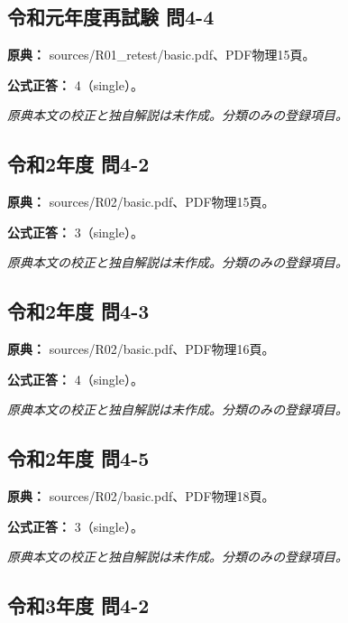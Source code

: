 \subsection{令和元年度再試験 問4-4}
\label{q:r01-ret-basic-4-4}

\noindent\textbf{原典：} sources/R01\_retest/basic.pdf、PDF物理15頁。

\textbf{公式正答：} 4（single）。

\par\textit{原典本文の校正と独自解説は未作成。分類のみの登録項目。}

\subsection{令和2年度 問4-2}
\label{q:r02-reg-basic-4-2}

\noindent\textbf{原典：} sources/R02/basic.pdf、PDF物理15頁。

\textbf{公式正答：} 3（single）。

\par\textit{原典本文の校正と独自解説は未作成。分類のみの登録項目。}

\subsection{令和2年度 問4-3}
\label{q:r02-reg-basic-4-3}

\noindent\textbf{原典：} sources/R02/basic.pdf、PDF物理16頁。

\textbf{公式正答：} 4（single）。

\par\textit{原典本文の校正と独自解説は未作成。分類のみの登録項目。}

\subsection{令和2年度 問4-5}
\label{q:r02-reg-basic-4-5}

\noindent\textbf{原典：} sources/R02/basic.pdf、PDF物理18頁。

\textbf{公式正答：} 3（single）。

\par\textit{原典本文の校正と独自解説は未作成。分類のみの登録項目。}

\subsection{令和3年度 問4-2}
\label{q:r03-reg-basic-4-2}

